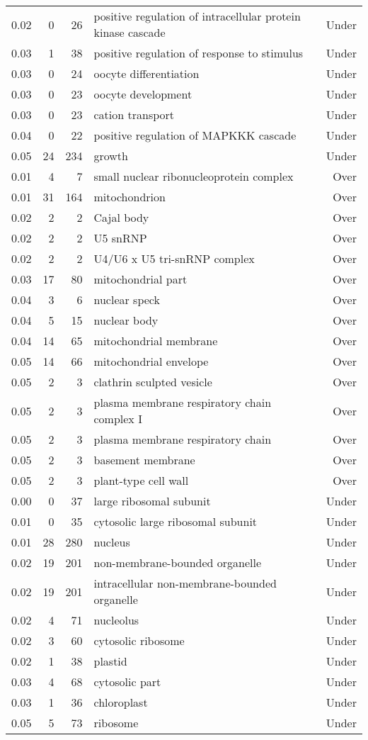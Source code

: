 \documentclass[10pt]{bmc_article}
\newenvironment{bmcformat}{\begin{raggedright}\baselineskip20pt\sloppy\setboolean{publ}{false}}{\end{raggedright}\baselineskip20pt\sloppy}
\begin{document}
\begin{bmcformat}
\begin{longtable}{rrrp{7cm}r}
  0.02 &   0 &  26 & positive regulation of intracellular protein kinase cascade & Under \\ 
  0.03 &   1 &  38 & positive regulation of response to stimulus & Under \\ 
  0.03 &   0 &  24 & oocyte differentiation & Under \\ 
  0.03 &   0 &  23 & oocyte development & Under \\ 
  0.03 &   0 &  23 & cation transport & Under \\ 
  0.04 &   0 &  22 & positive regulation of MAPKKK cascade & Under \\ 
  0.05 &  24 & 234 & growth & Under \\ 
   \hline
0.01 &   4 &   7 & small nuclear ribonucleoprotein complex & Over \\ 
  0.01 &  31 & 164 & mitochondrion & Over \\ 
  0.02 &   2 &   2 & Cajal body & Over \\ 
  0.02 &   2 &   2 & U5 snRNP & Over \\ 
  0.02 &   2 &   2 & U4/U6 x U5 tri-snRNP complex & Over \\ 
  0.03 &  17 &  80 & mitochondrial part & Over \\ 
  0.04 &   3 &   6 & nuclear speck & Over \\ 
  0.04 &   5 &  15 & nuclear body & Over \\ 
  0.04 &  14 &  65 & mitochondrial membrane & Over \\ 
  0.05 &  14 &  66 & mitochondrial envelope & Over \\ 
  0.05 &   2 &   3 & clathrin sculpted vesicle & Over \\ 
  0.05 &   2 &   3 & plasma membrane respiratory chain complex I & Over \\ 
  0.05 &   2 &   3 & plasma membrane respiratory chain & Over \\ 
  0.05 &   2 &   3 & basement membrane & Over \\ 
  0.05 &   2 &   3 & plant-type cell wall & Over \\ 
  0.00 &   0 &  37 & large ribosomal subunit & Under \\ 
  0.01 &   0 &  35 & cytosolic large ribosomal subunit & Under \\ 
  0.01 &  28 & 280 & nucleus & Under \\ 
  0.02 &  19 & 201 & non-membrane-bounded organelle & Under \\ 
  0.02 &  19 & 201 & intracellular non-membrane-bounded organelle & Under \\ 
  0.02 &   4 &  71 & nucleolus & Under \\ 
  0.02 &   3 &  60 & cytosolic ribosome & Under \\ 
  0.02 &   1 &  38 & plastid & Under \\ 
  0.03 &   4 &  68 & cytosolic part & Under \\ 
  0.03 &   1 &  36 & chloroplast & Under \\ 
  0.05 &   5 &  73 & ribosome & Under \\ 
   \hline
\hline
\end{longtable}

\end{bmcformat}
\end{document}
